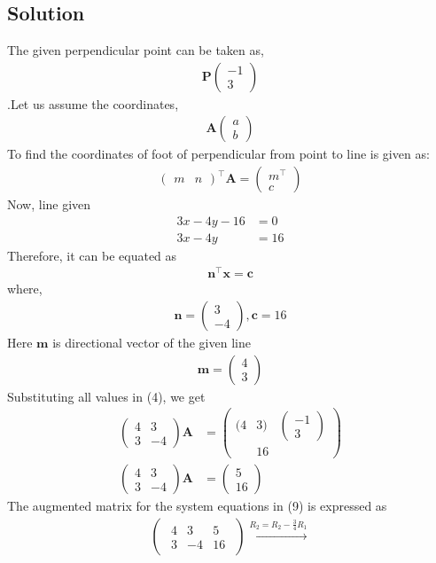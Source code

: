 \documentclass[12pt]{article}
\let\vec\mathbf
\newcommand{\myvec}[1]{\ensuremath{\begin{pmatrix}#1\end{pmatrix}}}
\let\vec\mathbf
\begin{document}
\begin{enumerate}
\section{Solution}
The given perpendicular point can be taken as,
\begin{align}
 \vec{P}\myvec{
-1\\
3
}
\end{align}
.Let us assume the coordinates,
\begin{align}
\vec{A}\myvec{
a\\
b
}
\end{align}
To find the coordinates of foot of perpendicular from point to line is given as:
\begin{align}
\myvec{
m&n
}^\top \vec{A} = \myvec{
m^\top\\
c
}
\end{align}
Now, line given 
\begin{align}
3x-4y-16 &=0\\
3x-4y&=16
\end{align}
Therefore, it can be equated as
\begin{align}
\vec{n}^\top \vec{x} = \vec{c}      \label{4}
\end{align}
where,
\begin{align}
\vec{n}=\myvec{
3\\
-4
}, \vec{c}=16
\end{align}
Here $\vec{m}$ is directional vector of the given line
\begin{align}
\vec{m}=\myvec{
4\\3}
\end{align}
Substituting all values in (4), we get
\begin{align}
\myvec
{4&3\\3&-4}\vec{A}&=\myvec{(4&3)&\myvec{-1\\3}\\&16}\\
\myvec
{4&3\\3&-4}\vec{A}&=\myvec{5\\16}  \label{9}
\end{align}
The augmented matrix for the system equations in (9) is expressed as
\begin{align}
  \begin{pmatrix}
  \begin{array}{rr|r}
   4 &  3  & 5\\
   3 & -4  & 16 
  \end{array}
  \end{pmatrix}\xrightarrow[]{R_2=R_2-\frac{3}{4}R_1}

\end{align}
\end{enumerate}
\end{document}
